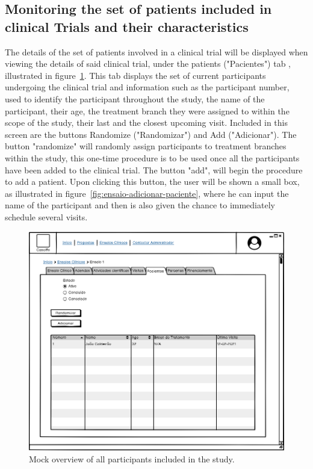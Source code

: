 \subsection{Monitoring the set of patients included in clinical Trials and their characteristics}
\label{subsec:monitor-set-of-patients}
The details of the set of patients involved in a clinical trial will be displayed when viewing the details of said clinical trial, under the patients ("Pacientes") tab , illustrated in figure~\ref{fig:ensaio-participantes}. This tab displays the set of current participants undergoing the clinical trial and information such as the participant number, used to identify the participant throughout the study, the name of the participant, their age, the treatment branch they were assigned to within the scope of the study, their last and the closest upcoming visit.  
Included in this screen are the buttons Randomize ("Randomizar") and Add ("Adicionar").
The button "randomize" will randomly assign participants to treatment branches within the study, this one-time procedure is to be used once all the participants have been added to the clinical trial.
The button "add", will begin the procedure to add a patient. Upon clicking this button, the user will be shown a small box, as illustrated in figure~\ref{fig:ensaio-adicionar-paciente}, where he can input the name of the participant and then is also given the chance to immediately schedule several visits.

\begin{figure}[H]
    \centering
    \includegraphics[scale=0.35]{Chapters/img/ensaios/ensaio-participantes.png}
    \caption{Mock overview of all participants included in the study.}
    \label{fig:ensaio-participantes}
\end{figure}

